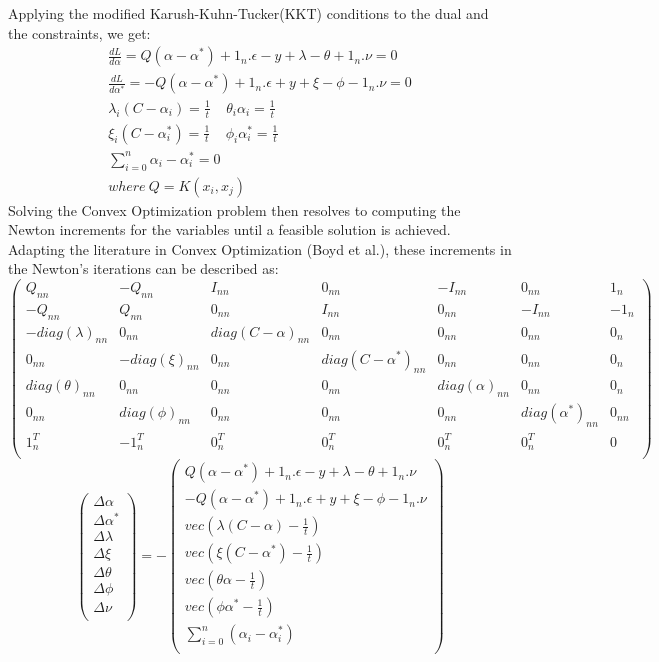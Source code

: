\documentclass[12pt]{article}
\begin{document}
 Applying the modified Karush-Kuhn-Tucker(KKT) conditions to the dual and the constraints, we get:
 \begin{gather*} 
 \frac{dL}{d\alpha} = Q(\alpha - \alpha^*) + 1_{n}.\epsilon - y + \lambda - \theta + 1_{n}.\nu=0 \\
 \frac{dL}{d\alpha^*} = -Q(\alpha - \alpha^*) + 1_{n}.\epsilon + y + \xi - \phi - 1_{n}.\nu=0 \\
 \lambda_{i}(C-\alpha_{i}) =\frac{1}{t}\ \ \ \ \ 
 \theta_{i}\alpha_{i} =\frac{1}{t}\\
 \xi_{i}(C-\alpha^*_{i}) =\frac{1}{t}\ \ \ \ \ 
 \phi_{i}\alpha^*_{i} =\frac{1}{t}\\
 \sum_{i=0}^{n}{\alpha_{i} - \alpha_{i}^*} =0\\
 where\ Q=K(x_{i}, x_{j})
 \end{gather*}
 Solving the Convex Optimization problem then resolves to computing the Newton increments for the variables until a feasible solution is achieved.
 Adapting the literature in Convex Optimization (Boyd et al.), these increments in the Newton's iterations can be described as:
 \cleardoublepage
\[
\begin{pmatrix} 
Q_{nn}&-Q_{nn}&I_{nn}&0_{nn}&-I_{nn}&0_{nn}&1_{n}\\
-Q_{nn}&Q_{nn}&0_{nn}&I_{nn}&0_{nn}&-I_{nn}&-1_{n}\\
-diag(\lambda)_{nn}&0_{nn}&diag(C-\alpha)_{nn}&0_{nn}&0_{nn}&0_{nn}&0_{n}\\
0_{nn}&-diag(\xi)_{nn}&0_{nn}&diag(C-\alpha^*)_{nn}&0_{nn}&0_{nn}&0_{n}\\
diag(\theta)_{nn}&0_{nn}&0_{nn}&0_{nn}&diag(\alpha)_{nn}&0_{nn}&0_{n}\\
0_{nn}&diag(\phi)_{nn}&0_{nn}&0_{nn}&0_{nn}&diag(\alpha^*)_{nn}&0_{nn}\\
1_{n}^T&-1_{n}^T&0_{n}^T&0_{n}^T&0_{n}^T&0_{n}^T&0\\
\end{pmatrix}
\]
\[
\begin{pmatrix} 
\Delta \alpha\\
\Delta \alpha^*\\
\Delta\lambda\\
\Delta\xi\\
\Delta\theta\\
\Delta\phi\\
\Delta\nu\\
\end{pmatrix}
=-
\begin{pmatrix} 
Q(\alpha - \alpha^*) + 1_{n}.\epsilon - y + \lambda - \theta + 1_{n}.\nu\\
-Q(\alpha - \alpha^*) + 1_{n}.\epsilon + y + \xi - \phi - 1_{n}.\nu\\
vec(\lambda(C-\alpha)-\frac{1}{t})\\
vec(\xi(C-\alpha^*)-\frac{1}{t})\\
vec(\theta\alpha-\frac{1}{t})\\
vec(\phi \alpha^*-\frac{1}{t})\\
\sum_{i=0}^{n}{(\alpha_{i} - \alpha_{i}^*)}\\
\end{pmatrix}
\]
\end{document}

